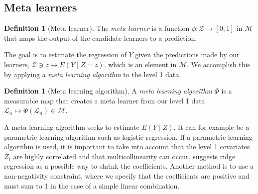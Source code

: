 \documentclass[11pt, a4paper]{article}
\theoremstyle{definition}
\newtheorem{definition}[theorem]{Definition}
\theoremstyle{remark}
\newcommand{\lone}{\mathcal{L}}
\newcommand{\meta}{\phi}
\newcommand{\Meta}{\Phi}
\begin{document}
\subsection{Meta learners}
\begin{definition}[Meta learner]
    The \textit{meta learner} is a function $ \meta: \mathcal{Z} \to [0,1] $ in $ \mathcal{M} $ that maps the output of the candidate learners to a prediction. 
\end{definition}
The goal is to estimate the regression of $ Y $ given the predictions made by our learners, $ \mathcal{Z} \ni z \mapsto E(Y \mid Z = z) $, which is an element in $ \mathcal{M} $. We accomplish this by applying a \textit{meta learning algorithm} to the level 1 data. 
\begin{definition}[Meta learning algorithm]
    A \textit{meta learning algorithm} $ \Meta $ is a measurable map that creates a meta learner from our level 1 data $ \lone_{n} \mapsto \Meta(\lone_{n}) \in \mathcal{M} $. 
\end{definition}
A meta learning algorithm seeks to estimate $ E (Y \mid Z) $. It can for example be a parametric learning algorithm such as logistic regression. If a parametric learning algorithm is used, it is important to take into account that the level 1 covariates $ Z_i $ are highly correlated and that multicollinearity can occur. \citet{breiman1996stacked} suggests ridge regression as a possible way to shrink the coefficients. Another method is to use a non-negativity constraint, where we specify that the coefficients are positive and must sum to 1 in the case of a simple linear combination. 
\end{document}
